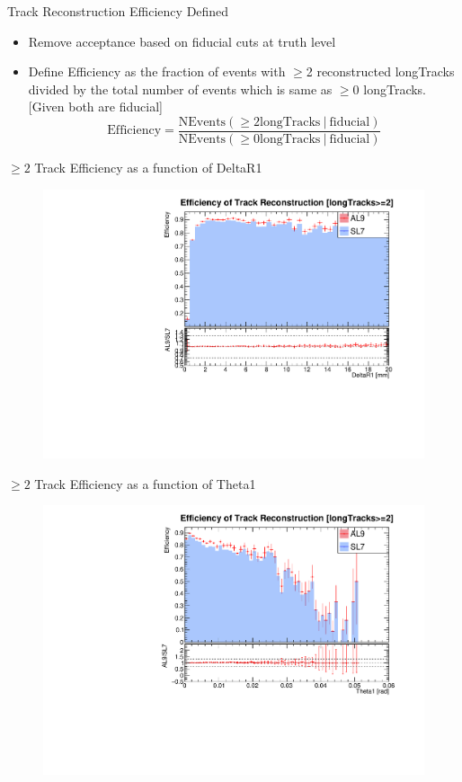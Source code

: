 \begin{frame}{Track Reconstruction Efficiency Defined}
    \begin{itemize}
        \item Remove acceptance based on fiducial cuts at truth level
        \item Define Efficiency as the fraction of events with $\geq$2 reconstructed longTracks divided by the total number of events which is same as $\geq$0 longTracks. [Given both are fiducial] 
        \[ \text{Efficiency} = \frac{\text{NEvents}({\geq 2 \text{longTracks}}\ | \ \text{fiducial})}{\text{NEvents}(\geq0{\text{longTracks}}\ | \ \text{fiducial})} \]
    \end{itemize}
\end{frame}

\begin{frame}{$\geq2$ Track Efficiency as a function of DeltaR1}
    \begin{figure}
        \includegraphics[width=\linewidth]{./output/Effi_greq2_DeltaR1.pdf}
    \end{figure}
\end{frame}


\begin{frame}{$\geq2$ Track Efficiency as a function of Theta1}
    \begin{figure}
        \includegraphics[width=\linewidth]{./output/Effi_greq2_Theta1.pdf}
    \end{figure}
\end{frame}

